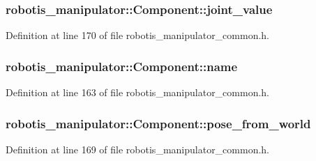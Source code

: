 \subsubsection[{\texorpdfstring{joint\+\_\+value}{joint_value}}]{ robotis\+\_\+manipulator\+::\+Component\+::joint\+\_\+value}\hypertarget{structrobotis__manipulator_1_1_component_a06de8406b177d397a1f998fdf9d67d95}{}\label{structrobotis__manipulator_1_1_component_a06de8406b177d397a1f998fdf9d67d95}


Definition at line 170 of file robotis\+\_\+manipulator\+\_\+common.\+h.

\subsubsection[{\texorpdfstring{name}{name}}]{ robotis\+\_\+manipulator\+::\+Component\+::name}\hypertarget{structrobotis__manipulator_1_1_component_a022aa062d295a3a6b5815a58b74e558f}{}\label{structrobotis__manipulator_1_1_component_a022aa062d295a3a6b5815a58b74e558f}


Definition at line 163 of file robotis\+\_\+manipulator\+\_\+common.\+h.

\subsubsection[{\texorpdfstring{pose\+\_\+from\+\_\+world}{pose_from_world}}]{ robotis\+\_\+manipulator\+::\+Component\+::pose\+\_\+from\+\_\+world}\hypertarget{structrobotis__manipulator_1_1_component_a0b28dd5fe885ff8f07d75733d6e777fc}{}\label{structrobotis__manipulator_1_1_component_a0b28dd5fe885ff8f07d75733d6e777fc}


Definition at line 169 of file robotis\+\_\+manipulator\+\_\+common.\+h.

